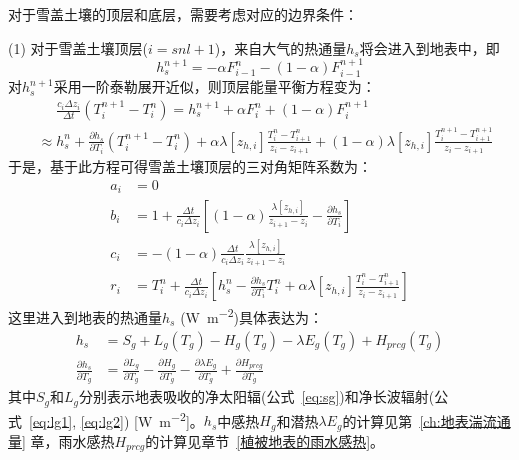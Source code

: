 对于雪盖土壤的顶层和底层，需要考虑对应的边界条件：

(1) 对于雪盖土壤顶层($i=snl+1$)，来自大气的热通量$h_s$将会进入到地表中，即
\begin{equation}
h_{s}^{n+1}=-\alpha F_{i-1}^{n}-(1-\alpha) F_{i-1}^{n+1}
\end{equation}
对$h_s^{n+1}$采用一阶泰勒展开近似，则顶层能量平衡方程变为：
\begin{equation}
\begin{split}
&\mathrel{\phantom{\approx}}\frac{c_{i} \Delta z_{i}}{\Delta t}\left(T_{i}^{n+1}-T_{i}^{n}\right)=h_{s}^{n+1}+\alpha F_{i}^{n}+(1-\alpha) F_{i}^{n+1} \\[1ex] 
&\approx h_{s}^{n}+\frac{\partial h_{s}}{\partial T_{i}}\left(T_{i}^{n+1}-T_{i}^{n}\right)+\alpha \lambda\left[z_{h, i}\right] \frac{T_{i}^{n}-T_{i+1}^{n}}{z_{i}-z_{i+1}}+(1-\alpha) \lambda\left[z_{h, i}\right] \frac{T_{i}^{n+1}-T_{i+1}^{n+1}}{z_{i}-z_{i+1}}
\end{split}
\end{equation}
于是，基于此方程可得雪盖土壤顶层的三对角矩阵系数为：
\begin{equation}
\begin{aligned}
a_{i} &= 0 \\[1ex] 
b_{i} &= 1+\frac{\Delta t}{c_{i} \Delta z_{i}}\left[(1-\alpha) \frac{\lambda\left[z_{h, i}\right]}{z_{i+1}-z_{i}}-\frac{\partial h_{s}}{\partial T_{i}}\right] \\[1ex]
c_{i} &= -(1-\alpha) \frac{\Delta t}{c_{i} \Delta z_{i}} \frac{\lambda\left[z_{h, i}\right]}{z_{i+1}-z_{i}} \\[1ex]
r_{i} &= T_{i}^{n}+\frac{\Delta t}{c_{i} \Delta z_{i}}\left[h_{s}^{n}-\frac{\partial h_{s}}{\partial T_{i}} T_{i}^{n}+\alpha \lambda\left[z_{h, i}\right] \frac{T_{i}^{n}-T_{i+1}^{n}}{z_{i}-z_{i+1}}\right]
\end{aligned}
\end{equation}
这里进入到地表的热通量$h_s$ (\unit{W.m^{-2}})具体表达为：
\begin{equation}
\begin{aligned}
h_{s} &= S_{g}+L_{g}\left(T_{g}\right)-H_{g}\left(T_{g}\right)-\lambda E_{g}\left(T_{g}\right)+H_{p r c g}\left(T_{g}\right) \\[1.5ex]
\frac{\partial h_{s}}{\partial T_{g}} &= \frac{\partial L_{g}}{\partial T_{g}}-\frac{\partial H_{g}}{\partial T_{g}}-\frac{\partial \lambda E_{g}}{\partial T_{g}}+\frac{\partial H_{p r c g}}{\partial T_{g}}
\end{aligned}
\end{equation}
其中$S_g$和$L_g$分别表示地表吸收的净太阳辐(公式~\eqref{eq:sg})和净长波辐射(公式~\eqref{eq:lg1}, \eqref{eq:lg2}) [\unit{W.m^{-2}}]。$h_s$中感热$H_{g}$和潜热$\lambda E_g$的计算见第~\ref{ch:地表湍流通量} 章，雨水感热$H_{prcg}$的计算见章节~\ref{植被地表的雨水感热}。

